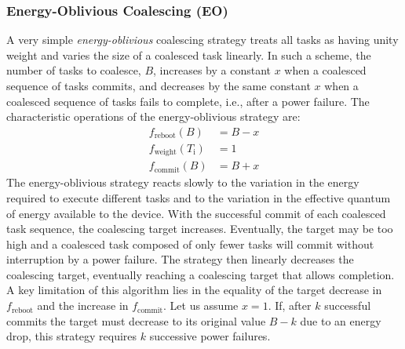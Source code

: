 \subsubsection{Energy-Oblivious Coalescing (EO)}
\label{subsec:energyBlind}
% 
A very simple {\em energy-oblivious} coalescing strategy treats all tasks as
having unity weight and varies the size of a coalesced task linearly. In such a
scheme, the number of tasks to coalesce, $B$, increases by a constant $x$ when
a coalesced sequence of tasks commits, and decreases by the same constant $x$
when a coalesced sequence of tasks fails to complete, i.e., after a power
failure. The characteristic operations of the energy-oblivious strategy are: 
%
\begin{equation}
	\begin{split}
		f_\text{reboot}(B)  		&	 = B - x \\
		f_\text{weight}(T_\text{i}) & 	 =  1 \\
		f_\text{commit}(B) 			& 	 = B + x
	\end{split}
\end{equation}
%
The energy-oblivious strategy reacts slowly to the variation in the energy
required to execute different tasks and to the variation in the effective quantum of
energy available to the device. With the successful commit of each coalesced task sequence, the coalescing target increases.  Eventually, the target may be too high and a coalesced task
composed of only fewer tasks will commit without interruption by a power
failure.
%
The strategy then linearly decreases the coalescing target, eventually reaching a
coalescing target that allows completion.
%
A key limitation of this algorithm lies in the equality of the target decrease
in $f_\text{reboot}$ and the increase in $f_\text{commit}$.  Let us assume $x=1$. If, after $k$ successful commits the target must decrease to its original value $B-k$ due to an energy drop, this strategy requires $k$ successive power failures.
%
